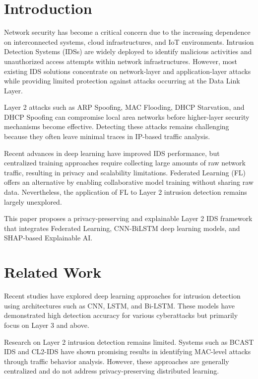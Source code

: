 \documentclass[conference]{IEEEtran}
\begin{document}
\section{Introduction}

Network security has become a critical concern due to the increasing dependence on interconnected systems, cloud infrastructures, and IoT environments. Intrusion Detection Systems (IDSs) are widely deployed to identify malicious activities and unauthorized access attempts within network infrastructures. However, most existing IDS solutions concentrate on network-layer and application-layer attacks while providing limited protection against attacks occurring at the Data Link Layer.

Layer 2 attacks such as ARP Spoofing, MAC Flooding, DHCP Starvation, and DHCP Spoofing can compromise local area networks before higher-layer security mechanisms become effective. Detecting these attacks remains challenging because they often leave minimal traces in IP-based traffic analysis.

Recent advances in deep learning have improved IDS performance, but centralized training approaches require collecting large amounts of raw network traffic, resulting in privacy and scalability limitations. Federated Learning (FL) offers an alternative by enabling collaborative model training without sharing raw data. Nevertheless, the application of FL to Layer 2 intrusion detection remains largely unexplored.

This paper proposes a privacy-preserving and explainable Layer 2 IDS framework that integrates Federated Learning, CNN-BiLSTM deep learning models, and SHAP-based Explainable AI.

\section{Related Work}

Recent studies have explored deep learning approaches for intrusion detection using architectures such as CNN, LSTM, and Bi-LSTM. These models have demonstrated high detection accuracy for various cyberattacks but primarily focus on Layer 3 and above.

Research on Layer 2 intrusion detection remains limited. Systems such as BCAST IDS and CL2-IDS have shown promising results in identifying MAC-level attacks through traffic behavior analysis. However, these approaches are generally centralized and do not address privacy-preserving distributed learning.
\end{document}
